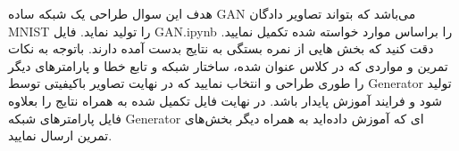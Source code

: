 هدف این سوال طراحی یک شبکه ساده GAN می‌باشد که بتواند تصاویر دادگان MNIST را تولید نماید. فایل GAN.ipynb را براساس موارد خواسته شده تکمیل نمایید. دقت کنید که بخش هایی از نمره بستگی به نتایج بدست آمده دارند. باتوجه به نکات تمرین و مواردی که در کلاس عنوان شده،‌ ساختار شبکه و تابع خطا و پارامترهای دیگر را طوری طراحی و انتخاب نمایید که در نهایت تصاویر باکیفیتی توسط Generator تولید شود و فرایند آموزش پایدار باشد.
در نهایت فایل تکمیل شده به همراه نتایج را بعلاوه فایل پارامترهای شبکه Generator ای که آموزش داده‌اید به همراه دیگر بخش‌های تمرین ارسال نمایید.